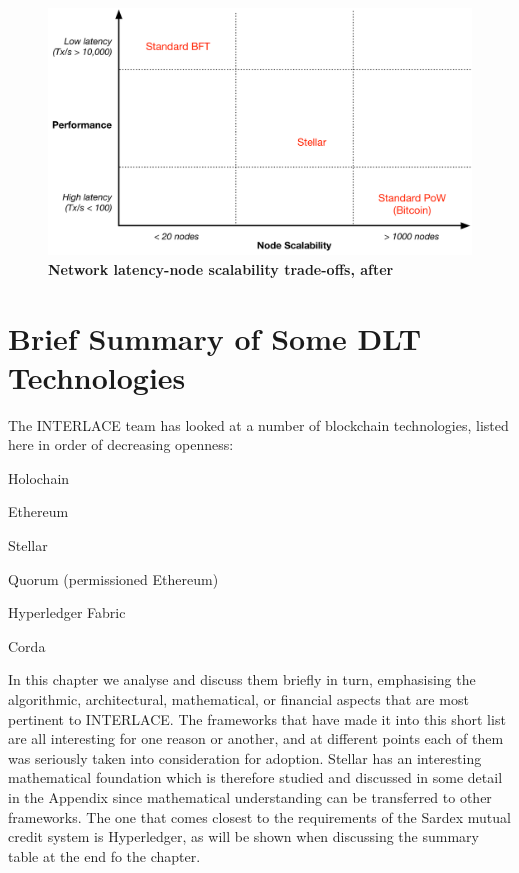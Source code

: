 \begin{figure}[h]
\centering
\includegraphics[width=14 cm]{Figures/consensus_tradeoffs}
\caption{\bf \small Network latency-node scalability trade-offs, after \cite{vukolic2015}}
\label{fig:consensus_tradeoffs}
\end{figure}


\section{Brief Summary of Some DLT Technologies}

The INTERLACE team has looked at a number of blockchain technologies, listed here in order of decreasing openness:
\begin{packed_item1}
\item Holochain
\item Ethereum
\item Stellar
\item Quorum (permissioned Ethereum)
\item Hyperledger Fabric
\item Corda
\end{packed_item1}
In this chapter we analyse and discuss them briefly in turn, emphasising the algorithmic, architectural,  mathematical, or financial aspects that are most pertinent to INTERLACE. The frameworks that have made it into this short list are all interesting for one reason or another, and at different points each of them was seriously taken into consideration for adoption. Stellar has an interesting mathematical foundation which is therefore studied and discussed in some detail in the Appendix since mathematical understanding can be transferred to other frameworks. The one that comes closest to the requirements of the Sardex mutual credit system is Hyperledger, as will be shown when discussing the summary table at the end fo the chapter.


